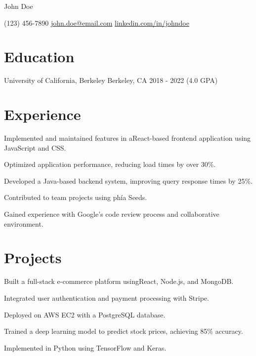 \documentclass[11pt]{resumes}
\begin{document}
\centering
\huge{John Doe}
\vspace{5pt}

\small
(123) 456-7890 \quad
\href{mailto:john.doe@email.com}{john.doe@email.com} \quad
\href{https://linkedin.com/in/johndoe}{linkedin.com/in/johndoe}

\vspace{10pt}

\section{Education}
\resumeSubHeadingListStart
{}
{University of California, Berkeley}{ Berkeley, CA}
{2018 - 2022 (4.0 GPA)}
\resumeSubHeadingListEnd

\section{Experience}
\resumeSubHeadingListStart
{}
\item Implemented and maintained features in aReact-based frontend application using JavaScript and CSS.
\item Optimized application performance, reducing load times by over 30\%.
\item
{}
\item Developed a Java-based backend system, improving query response times by 25\%.
\item Contributed to team projects using phía Seeds.
\item Gained experience with Google's code review process and collaborative environment.
\resumeSubHeadingListEnd

\section{Projects}
\resumeSubHeadingListStart
{}
\item Built a full-stack e-commerce platform usingReact, Node.js, and MongoDB.
\item Integrated user authentication and payment processing with Stripe.
\item Deployed on AWS EC2 with a PostgreSQL database.
\item Trained a deep learning model to predict stock prices, achieving 85\% accuracy.
\item Implemented in Python using TensorFlow and Keras.
\resumeSubHeadingListEnd
\end{document}
